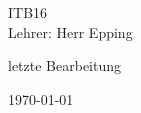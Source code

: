 \vspace{15mm}
\begin{center}
    {\color{white}\LARGE{\textbf{\vspace{30mm}} \colorbox{BurntOrange}{ITB16}\\\vspace{5mm}\colorbox{BurntOrange}{Lehrer: Herr Epping}}}
\end{center}



\color{white}\centering\large\colorbox{BurntOrange}{letzte Bearbeitung}

\color{white}\centering\large\colorbox{BurntOrange}{\today\hspace{0.2cm}\currenttime}
